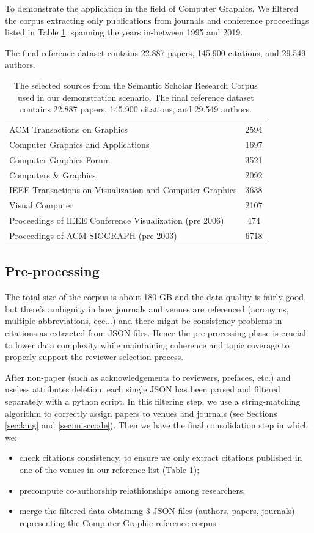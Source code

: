 To demonstrate the application in the field of Computer Graphics, We filtered the corpus extracting only publications from journals and conference proceedings listed in Table \ref{table:sources}, spanning the years in-between 1995 and 2019. 

The final reference dataset contains 22.887 papers, 145.900 citations, and 29.549 authors.
\begin{table}[!ht]
\renewcommand{\arraystretch}{1.3}
\centering
\begin{tabular}{|l|c|}
\hline
ACM Transactions on Graphics & 2594\\ 
Computer Graphics and Applications  & 1697 \\ 
Computer Graphics Forum & 3521\\ 
Computers \& Graphics & 2092\\ 
IEEE Transactions on Visualization and Computer Graphics & 3638\\ 
Visual Computer & 2107\\ 
Proceedings of IEEE Conference Visualization (pre 2006) & 474 \\ 
Proceedings of ACM SIGGRAPH (pre 2003) & 6718\\
\hline
\end{tabular}
\caption{The selected sources from the Semantic Scholar Research Corpus used in our demonstration scenario. The final reference dataset contains 22.887 papers, 145.900 citations, and 29.549 authors.}
\label{table:sources}
\end{table}

%
\subsection*{Pre-processing}
\label{sec:preproc}

The total size of the corpus is about 180 GB and the data quality is fairly good, but there's ambiguity in how journals and venues are referenced (acronyms, multiple abbreviations, ecc...) and there might be consistency problems in citations as extracted from JSON files. Hence the pre-processing phase is crucial to lower data complexity while maintaining coherence and topic coverage to properly support the reviewer selection process. 

After non-paper (such as acknowledgements to reviewers, prefaces, etc.) and useless attributes deletion, each single JSON has been parsed and filtered separately with a python script. In this filtering step, we use a string-matching algorithm to correctly assign papers to venues and journals (see Sections \ref{sec:lang} and \ref{sec:misccode}). Then we have the final consolidation step in which we:
\begin{itemize}
    \item check citations consistency, to ensure we only extract citations published in one of the venues in our reference list (Table \ref{table:sources});
    \item precompute co-authorship relathionships among researchers;
    \item merge the filtered data obtaining 3 JSON files (authors, papers, journals) representing the Computer Graphic reference corpus.
\end{itemize}

